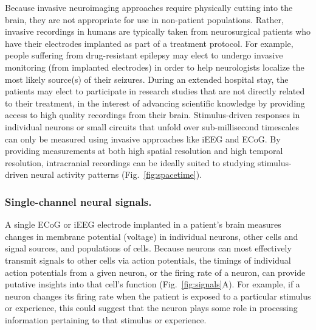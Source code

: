 \documentclass{llmxive}
\begin{document}
Because invasive neuroimaging approaches require physically cutting
into the brain, they are not appropriate for use in non-patient
populations.  Rather, invasive recordings in humans are typically
taken from neurosurgical patients who have their electrodes implanted
as part of a treatment protocol.  For example, people suffering from
drug-resistant epilepsy may elect to undergo invasive monitoring (from
implanted electrodes) in order to help neurologists localize the most
likely source(s) of their seizures.  During an extended hospital stay,
the patients may elect to participate in research studies that are not
directly related to their treatment, in the interest of advancing
scientific knowledge by providing access to high quality recordings
from their brain.  Stimulus-driven responses in individual neurons or
small circuits that unfold over sub-millisecond timescales can only
be measured using invasive approaches like iEEG and ECoG.  By
providing measurements at both high spatial resolution and high
temporal resolution, intracranial recordings can be ideally suited to
studying stimulus-driven neural activity patterns
(Fig.~\ref{fig:spacetime}).


\subsubsection{Single-channel neural signals.}
A single ECoG or iEEG electrode implanted in a patient's brain
measures changes in membrane potential (voltage) in individual
neurons, other cells and signal sources, and populations of cells.
Because neurons can most effectively transmit signals to other cells
via action potentials, the timings of individual action potentials from a
given neuron, or the firing rate of a neuron, can provide putative
insights into that cell's function (Fig.~\ref{fig:signals}A).  For
example, if a neuron changes its firing rate when the patient is
exposed to a particular stimulus or experience, this could suggest
that the neuron plays some role in processing information pertaining
to that stimulus or experience.
\end{document}
